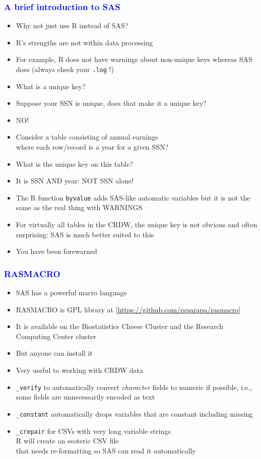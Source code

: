 \documentclass[11pt,pdftex,dvipsnames,usenames]{beamer}
\begin{document}
\begin{frame}[fragile]\frametitle{\bf\textcolor{blue}{A brief
introduction to SAS}}

\begin{itemize}
\item Why not just use R instead of SAS?
\item R's strengths are not within data processing
\item For example, R does not have warnings about non-unique keys
whereas SAS does (always check your \texttt{.log} !)
\item What is a unique key?
\item Suppose your SSN is unique, does that make it a unique key?
\item NO! %
\item Consider a table consisting of annual earnings\\ 
where each row/record is a year for a given SSN?
\item What is the unique key on this table?
\item It is SSN AND year: NOT SSN alone!
\item The R function \texttt{byvalue} adds SAS-like
automatic variables but it is not the same as the real
thing with WARNINGS
\item For virtually all tables in the CRDW, the unique key
is not obvious and often surprising: SAS is much better suited to this
\item You have been forewarned
\end{itemize}

\end{frame}


\begin{frame}[fragile]\frametitle{\bf\textcolor{blue}{RASMACRO}}
\begin{itemize}
\item SAS has a powerful macro language
\item RASMACRO is GPL library at 
\textcolor{PineGreen}{[\href{https://github.com/rsparapa/rasmacro}{https://github.com/rsparapa/rasmacro}]}
\item It is available on the Biostatistics Cheese Cluster
and the Research Computing Center cluster
\item But anyone can install it
\item Very useful to working with CRDW data 
\item \texttt{\_verify} to automatically convert {\it character} fields to numeric if possible,
i.e., some fields are unnecessarily encoded as text
\item \texttt{\_constant} automatically drops variables that are constant including missing
\item \texttt{\_crepair} for CSVs with very long variable strings\\
R will create an esoteric CSV file\\
that needs re-formatting so SAS can read it automatically
\end{itemize}
\end{frame}
\end{document}
